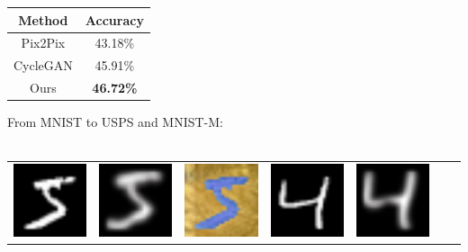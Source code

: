 \documentclass[landscape,a0paper,fontscale=0.285]{baposter} %
\begin{document}
\begin{poster}
{\begin{minipage}[t]{.5\linewidth}
\scriptsize
\setlength\tabcolsep{1pt}
\begin{tabular}{cc} \hline
  Method & Accuracy \\ \hline
  Pix2Pix & 43.18\% \\
  CycleGAN & 45.91\% \\
  Ours &  \textbf{46.72\%} \\ \hline
  \end{tabular}
\end{minipage}
{%
  \label{fig:mnist1}
}
\normalsize
From MNIST to USPS and MNIST-M:\\\\
\begin{minipage}[t]{.35\linewidth}
\setlength\tabcolsep{1pt}
\begin{tabular}{ccccccc}
\includegraphics[width=.16\textwidth]{figures/mnist/0_real_A.jpg}&
\includegraphics[width=.16\textwidth]{figures/mnist/0_fake_B.jpg}&
\includegraphics[width=.16\textwidth]{figures/mnist/0_fake_B-1.jpg}&
\includegraphics[width=.16\textwidth]{figures/mnist/2_real_A.jpg}&
\includegraphics[width=.16\textwidth]{figures/mnist/2_fake_B-1.jpg}&

\end{tabular}
\end{minipage}}
\end{poster}
\end{document}

